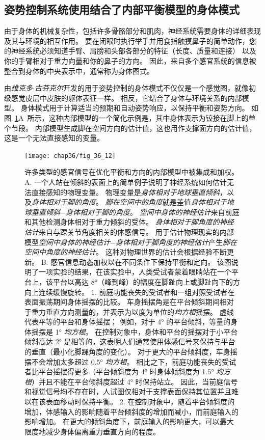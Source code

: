 \subsection{姿势控制系统使用结合了内部平衡模型的身体模式}

由于身体的机械复杂性，包括许多骨骼部分和肌肉，神经系统需要身体的详细表现及其与环境的相互作用。
要在闭眼时执行举手并用食指触摸鼻子的简单动作，您的神经系统必须知道手臂、肩膀和头部各部分的特征（长度、质量和连接） 以及你的手臂相对于重力向量和你的鼻子的方向。
因此，来自多个感官系统的信息被整合到身体的中央表示中，通常称为身体图式。


由\textit{维克多$\cdot$古芬克尔}开发的用于姿势控制的身体模式不仅仅是一个感觉图，就像初级感觉皮层中皮肤的躯体表征一样。
相反，它结合了身体与环境关系的内部模型。
身体模式用于计算适当的预期和自动姿势响应，以保持平衡和姿势方向。
如图~\ref{fig:36_12}A~所示，这种内部模型的一个简化示例是，其中身体表示为铰接在脚上的单个节段。
内部模型生成脚在空间方向的估计值，这也用作支撑面方向的估计值，这是一个无法直接感知的变量。


\begin{figure}[htbp]
	\centering
	\texttt{[image: chap36/fig\_36\_12]}
	\caption{许多类型的感官信号在优化平衡和方向的内部模型中被集成和加权\cite{peterka2002sensorimotor}。
		A. 一个人站在倾斜的表面上的简单例子说明了神经系统如何估计无法直接感知的物理变量。
		物理变量是\textit{身体相对于地球垂直倾斜}，以及\textit{身体相对于脚的角度}。
		\textit{脚在空间中的角度}就是差值\textit{身体相对于地球垂直倾斜}−\textit{身体相对于脚的角度}。
		\textit{空间中身体的神经估计}来自前庭和其他检测身体相对于重力倾斜的受体。
		\textit{身体相对于脚角度的神经估计}来自与踝关节角度相关的体感信号。
		用于估计物理现实的内部模型\textit{空间中身体的神经估计}−\textit{身体相对于脚角度的神经估计}产生\textit{脚在空间中角度的神经估计}。
		这种对物理世界的估计会根据经验不断更新。
		B. 感官信息动态加权以在不同条件下保持平衡和定向。
		该图说明了一项实验的结果，在该实验中，人类受试者蒙着眼睛站在一个平台上，该平台以高达 8°（峰到峰）的幅度在脚趾向上或脚趾向下的方向上连续缓慢旋转。
		1. 前庭功能丧失的受试者和一组对照受试者在表面振荡期间身体摇摆的比较。
		车身摇摆角是在平台倾斜期间相对于重力垂直方向测量的，并表示为以度为单位的\textit{均方根}摇摆。
		虚线代表平等的平台和身体摇摆；
		例如，对于 4° 的平台倾斜，等量的身体摇摆是 1° \textit{均方根}。
		在控制对象中，身体和平台的摇摆对于小平台倾斜高达 2° 是相等的，这表明人们通常使用体感信号来保持与平台的垂直（最小化脚踝角度的变化）。
		对于更大的平台倾斜度，车身摇摆不会增加太多超过 0.5° \textit{均方根}。
		相比之下，前庭功能丧失的受试者比平台摇摆得更多（平台倾斜度为 4° 时身体倾斜度为 1.5° \textit{均方根}）并且不能在平台倾斜度超过 4° 时保持站立。
		因此，当前庭信号和视觉信号均不存在时，人试图仅相对于支撑表面保持其位置并且难以在该表面移动时保持平衡。
		2. 在控制对象中，随着平台倾斜度的增加，体感输入的影响随着平台倾斜度的增加而减小，而前庭输入的影响增加。
		在更大的倾斜角度下，前庭输入的影响更大，可以最大限度地减少身体偏离重力垂直方向的程度。}
	\label{fig:36_12}
\end{figure}


